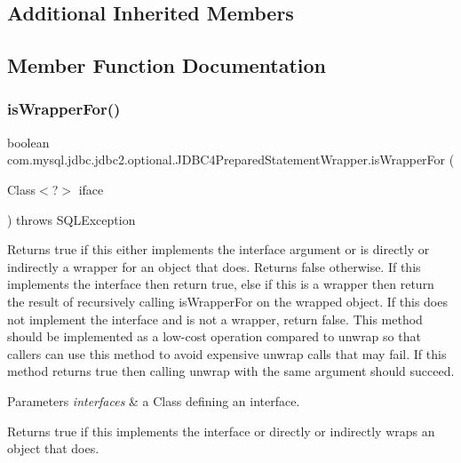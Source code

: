 \subsection*{Additional Inherited Members}


\subsection{Member Function Documentation}
\mbox{\label{classcom_1_1mysql_1_1jdbc_1_1jdbc2_1_1optional_1_1_j_d_b_c4_prepared_statement_wrapper_ad24e8bf78c2de9333ec47ea3baa517d4}} 
\subsubsection{\texorpdfstring{is\+Wrapper\+For()}{isWrapperFor()}}
{\footnotesize\ttfamily boolean com.\+mysql.\+jdbc.\+jdbc2.\+optional.\+J\+D\+B\+C4\+Prepared\+Statement\+Wrapper.\+is\+Wrapper\+For (\begin{DoxyParamCaption}\item[{Class$<$?$>$}]{iface }\end{DoxyParamCaption}) throws S\+Q\+L\+Exception}

Returns true if this either implements the interface argument or is directly or indirectly a wrapper for an object that does. Returns false otherwise. If this implements the interface then return true, else if this is a wrapper then return the result of recursively calling {\ttfamily is\+Wrapper\+For} on the wrapped object. If this does not implement the interface and is not a wrapper, return false. This method should be implemented as a low-\/cost operation compared to {\ttfamily unwrap} so that callers can use this method to avoid expensive {\ttfamily unwrap} calls that may fail. If this method returns true then calling {\ttfamily unwrap} with the same argument should succeed.


\begin{DoxyParams}{Parameters}
{\em interfaces} & a Class defining an interface. \\
\hline
\end{DoxyParams}
\begin{DoxyReturn}{Returns}
true if this implements the interface or directly or indirectly wraps an object that does. 
\end{DoxyReturn}

